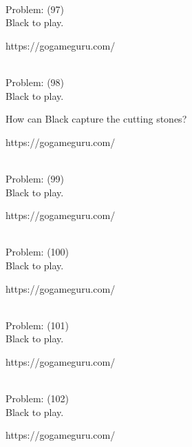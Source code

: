\documentclass[11pt]{article}
\begin{document}
\begin{minipage}[t]{0.5\textwidth}
  {\centering
  
\\
  Problem: (97)\\
  Black to play.

https://gogameguru.com/\\
  }
\end{minipage}
\begin{minipage}[t]{0.5\textwidth}
  {\centering
  
\\
  Problem: (98)\\
  Black to play.

How can Black capture the cutting stones?

https://gogameguru.com/\\
  }
\end{minipage}
\begin{minipage}[t]{0.5\textwidth}
  {\centering
  
\\
  Problem: (99)\\
  Black to play.

https://gogameguru.com/\\
  }
\end{minipage}
\begin{minipage}[t]{0.5\textwidth}
  {\centering
  
\\
  Problem: (100)\\
  Black to play.

https://gogameguru.com/\\
  }
\end{minipage}
\begin{minipage}[t]{0.5\textwidth}
  {\centering
  
\\
  Problem: (101)\\
  Black to play.

https://gogameguru.com/\\
  }
\end{minipage}
\begin{minipage}[t]{0.5\textwidth}
  {\centering
  
\\
  Problem: (102)\\
  Black to play.

https://gogameguru.com/\\
  }
\end{minipage}
\end{document}
